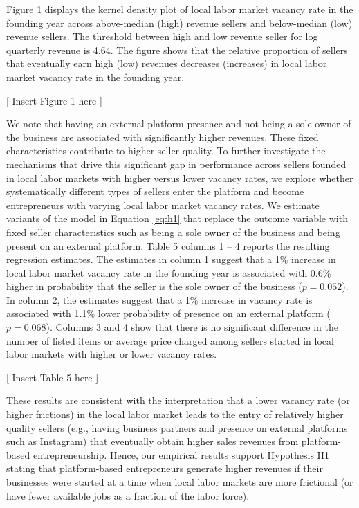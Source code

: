 \documentclass[letterpaper,12pt]{article}
\begin{document}
Figure 1 displays the kernel density plot of local labor market vacancy rate in the founding year across above-median (high) revenue sellers and below-median (low) revenue sellers. The threshold between high and low revenue seller for log quarterly revenue is 4.64. The figure shows that the relative proportion of sellers that eventually earn high (low) revenues decreases (increases) in local labor market vacancy rate in the founding year.

\begin{center}
[ Insert Figure 1 here ]
\end{center}

We note that having an external platform presence and not being a sole owner of the business are associated with significantly higher revenues. These fixed characteristics contribute to higher seller quality. To further investigate the mechanisms that drive this significant gap in performance across sellers founded in local labor markets with higher versus lower vacancy rates, we explore whether systematically different types of sellers enter the platform and become entrepreneurs with varying local labor market vacancy rates. We estimate variants of the model in Equation \ref{eq:h1} that replace the outcome variable with fixed seller characteristics such as being a sole owner of the business and being present on an external platform. Table 5 columns 1 -- 4 reports the resulting regression estimates. The estimates in column 1 suggest that a 1\% increase in local labor market vacancy rate in the founding year is associated with 0.6\% higher in probability that the seller is the sole owner of the business ($p=0.052$). In column 2, the estimates suggest that a 1\% increase in vacancy rate is associated with 1.1\% lower probability of presence on an external platform ($p=0.068$). Columns 3 and 4 show that there is no significant difference in the number of listed items or average price charged among sellers started in local labor markets with higher or lower vacancy rates.

\begin{center}
[ Insert Table 5 here ]
\end{center}

These results are consistent with the interpretation that a lower vacancy rate (or higher frictions) in the local labor market leads to the entry of relatively higher quality sellers (e.g., having business partners and presence on external platforms such as Instagram) that eventually obtain higher sales revenues from platform-based entrepreneurship. Hence, our empirical results support Hypothesis H1 stating that platform-based entrepreneurs generate higher revenues if their businesses were started at a time when local labor markets are more frictional (or have fewer available jobs as a fraction of the labor force).
\end{document}
